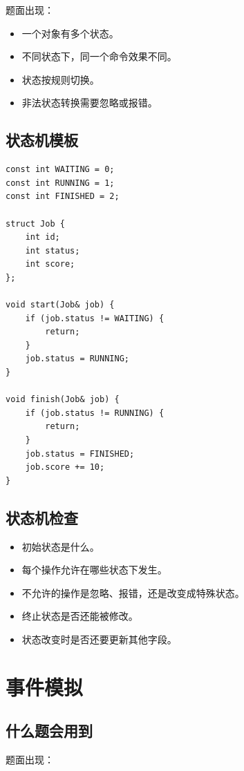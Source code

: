 题面出现：

\begin{itemize}
  \item 一个对象有多个状态。
  \item 不同状态下，同一个命令效果不同。
  \item 状态按规则切换。
  \item 非法状态转换需要忽略或报错。
\end{itemize}

\subsection{状态机模板}

\begin{lstlisting}
const int WAITING = 0;
const int RUNNING = 1;
const int FINISHED = 2;

struct Job {
    int id;
    int status;
    int score;
};

void start(Job& job) {
    if (job.status != WAITING) {
        return;
    }
    job.status = RUNNING;
}

void finish(Job& job) {
    if (job.status != RUNNING) {
        return;
    }
    job.status = FINISHED;
    job.score += 10;
}
\end{lstlisting}

\subsection{状态机检查}

\begin{itemize}
  \item 初始状态是什么。
  \item 每个操作允许在哪些状态下发生。
  \item 不允许的操作是忽略、报错，还是改变成特殊状态。
  \item 终止状态是否还能被修改。
  \item 状态改变时是否还要更新其他字段。
\end{itemize}

\section{事件模拟}\label{sec:07-14}

\subsection{什么题会用到}

题面出现：

